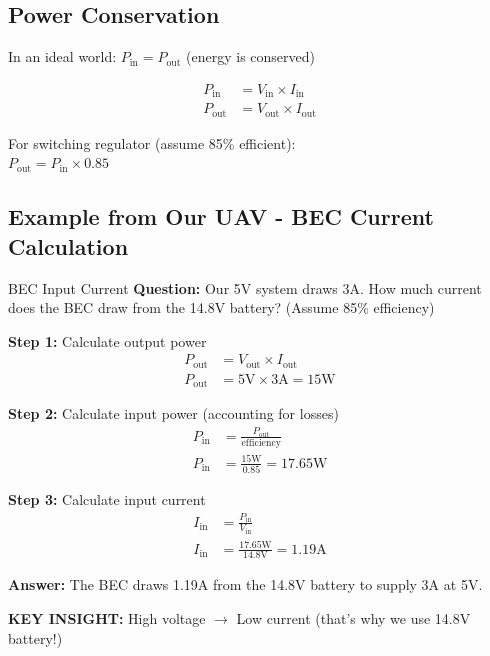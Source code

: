 \documentclass[11pt,letterpaper]{article}
\begin{document}
\subsection{Power Conservation}

In an ideal world: $P_{\text{in}} = P_{\text{out}}$ (energy is conserved)

\begin{align*}
P_{\text{in}} &= V_{\text{in}} \times I_{\text{in}}\\
P_{\text{out}} &= V_{\text{out}} \times I_{\text{out}}
\end{align*}

For switching regulator (assume 85\% efficient):\\
$P_{\text{out}} = P_{\text{in}} \times 0.85$

\subsection{Example from Our UAV - BEC Current Calculation}

\begin{examplebox}{BEC Input Current}
\textbf{Question:} Our 5V system draws 3A. How much current does the BEC draw from the 14.8V battery? (Assume 85\% efficiency)

\textbf{Step 1:} Calculate output power
\begin{align*}
P_{\text{out}} &= V_{\text{out}} \times I_{\text{out}}\\
P_{\text{out}} &= 5\text{V} \times 3\text{A} = 15\text{W}
\end{align*}

\textbf{Step 2:} Calculate input power (accounting for losses)
\begin{align*}
P_{\text{in}} &= \frac{P_{\text{out}}}{\text{efficiency}}\\
P_{\text{in}} &= \frac{15\text{W}}{0.85} = 17.65\text{W}
\end{align*}

\textbf{Step 3:} Calculate input current
\begin{align*}
I_{\text{in}} &= \frac{P_{\text{in}}}{V_{\text{in}}}\\
I_{\text{in}} &= \frac{17.65\text{W}}{14.8\text{V}} = 1.19\text{A}
\end{align*}

\textbf{Answer:} The BEC draws 1.19A from the 14.8V battery to supply 3A at 5V.

\textbf{KEY INSIGHT:} High voltage $\rightarrow$ Low current (that's why we use 14.8V battery!)
\end{examplebox}
\end{document}

